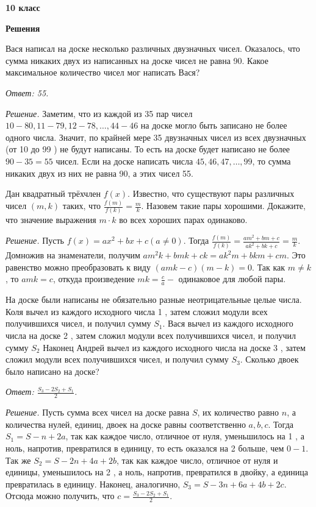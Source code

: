 \centerline{\bf \huge 10 класс}
\centerline{\bf \huge Решения}

Вася написал на доске несколько различных двузначных чисел. Оказалось, что сумма никаких двух из написанных на доске чисел не равна 90. Какое максимальное количество чисел мог написать Вася?

\textit{Ответ: 55.}

\textit{Решение.}
Заметим, что из каждой из 35 пар чисел $10-80,11-79,12-78, \ldots, 44-46$ на доске могло быть записано не более одного числа. Значит, по крайней мере 35 двузначных чисел из всех двузначных (от 10 до 99 ) не будут написаны. То есть на доске будет написано не более $90-35=55$ чисел.
Если на доске написать числа $45,46,47, \ldots, 99$, то сумма никаких двух из них не равна 90, а этих чисел 55.

Дан квадратный трёхчлен $f(x)$. Известно, что существуют пары различных чисел $(m, k)$ таких, что $\frac{f(m)}{f(k)}=\frac{m}{k}$. Назовем такие пары хорошими. Докажите, что значение выражения $m \cdot k$ во всех хороших парах одинаково.

\textit{Решение.}
Пусть $f(x)=a x^2+b x+c(a \neq 0)$. Тогда $\frac{f(m)}{f(k)}=\frac{a m^2+b m+c}{a k^2+b k+c}=\frac{m}{k}$. Домножив на знаменатели, получим $a m^2 k+b m k+c k=a k^2 m+b k m+c m$. Это равенство можно преобразовать к виду $(a m k-c)(m-k)=0$. Так как $m \neq k$, то $a m k=c$, откуда произведение $m k=\frac{c}{a}-$ одинаковое для любой пары.

На доске были написаны не обязательно разные неотрицательные целые числа. Коля вычел из каждого исходного числа 1 , затем сложил модули всех получившихся чисел, и получил сумму $S_1$. Вася вычел из каждого исходного числа на доске 2 , затем сложил модули всех получившихся чисел, и получил сумму $S_2$ Наконец Андрей вычел из каждого исходного числа на доске 3 , затем сложил модули всех получившихся чисел, и получил сумму $S_3$. Сколько двоек было написано на доске?

\textit{Ответ: $\frac{S_3-2 S_2+S_1}{2}$.}

\textit{Решение.} 
Пусть сумма всех чисел на доске равна $S$, их количество равно $n$, а количества нулей, единиц, двоек на доске равны соответственно $a, b, c$. Тогда $S_1=S-n+2 a$, так как каждое число, отличное от нуля, уменьшилось на 1 , а ноль, напротив, превратился в единицу, то есть оказался на 2 больше, чем $0-1$. Так же $S_2=S-2 n+4 a+2 b$, так как каждое число, отличное от нуля и единицы, уменьшилось на 2 , а ноль, напротив, превратился в двойку, а единица превратилась в единицу. Наконец, аналогично, $S_3=S-3 n+6 a+4 b+2 c$. Отсюда можно получить, что $c=\frac{S_3-2 S_2+S_1}{2}$.


